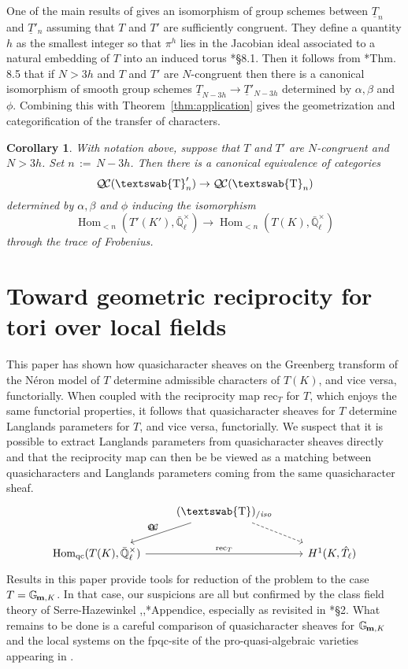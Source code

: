 \documentclass[11pt]{amsart}
\DeclareRobustCommand{\VAN}[3]{#2}
\newcommand{\mathswab}[1]{\operatorname{\textswab{#1}}}
\theoremstyle{plain}
\newtheorem{corollary}[theorem]{Corollary}
\theoremstyle{definition}
\theoremstyle{remark}
\newcommand{\EE}{\mathbb{\bar Q}_\ell}
\newcommand{\EEx}{\EE^\times}
\DeclareMathOperator{\Hom}{Hom}
\newcommand{\ceq}{{\, :=\, }}
\newcommand{\Gm}[1]{\mathbb{G}_{\hskip-1pt\textbf{m},#1}}
\newcommand{\GN}[1]{\mathswab{#1}}
\newcommand{\TT}{\underline{T}}
\newcommand{\QC}{{\mathcal{Q\hskip-0.8pt C}}}
\newcommand{\QCiso}[1]{\QC(#1)_{/\textit{iso}}}
\newcommand{\trFrob}[1]{t_{#1}}
\begin{document}
One of the main results of \cite{chai-yu:01a} gives an isomorphism of group schemes between
$\TT_n$ and $\TT'_n$ assuming that $T$ and $T'$ are sufficiently congruent.
They define a quantity $h$ as the smallest integer so that $\pi^h$ lies in the
Jacobian ideal associated to a natural embedding of $T$ into an induced torus \cite{chai-yu:01a}*{\S 8.1}.
Then it follows from \cite{chai-yu:01a}*{Thm. 8.5} that if $N > 3h$ and $T$ and $T'$ are $N$-congruent 
then there is a canonical isomorphism of smooth group schemes
 $
  \TT_{N-3h} \to \TT'_{N-3h}
 $
 determined by $\alpha, \beta$ and $\phi$.
Combining this with Theorem~\ref{thm:application} gives the geometrization and categorification of the transfer of characters.

\begin{corollary}\label{cor:transfer}
 With notation above, suppose that $T$ and $T'$ are $N$-congruent and $N > 3h$.  Set $n \ceq N-3h$.
 Then there is a canonical equivalence of categories
 \[
  \QC(\GN{T}'_{n}) \to \QC(\GN{T}_{n})
 \]
 determined by $\alpha, \beta$ and $\phi$ inducing the isomorphism
 \[
  \Hom_{<n}(T'(K'), \EEx) \to \Hom_{<n}(T(K), \EEx)
 \]
 through the trace of Frobenius.
\end{corollary}


\section{Toward geometric reciprocity for tori over local fields}
\label{sec:reciprocity}

This paper has shown how quasicharacter sheaves 
on the Greenberg transform of the Néron model of $T$ 
determine admissible characters of $T(K)$, and vice versa, functorially.
When coupled with the reciprocity map $\text{rec}_T $ for $T$, 
which enjoys the same functorial properties, 
it follows that quasicharacter sheaves for $T$ 
determine Langlands parameters for $T$, and vice versa, functorially.
We suspect that it is possible to extract Langlands parameters 
from quasicharacter sheaves directly and that the reciprocity map 
can then be be viewed as a matching between quasicharacters and Langlands parameters coming
 from the same quasicharacter sheaf. 
 \[
\begin{tikzcd}
\ & \arrow[swap]{dl}{\trFrob{G}} \QCiso{\GN{T}} \arrow[dashed]{dr} & \\
\Hom_{\text{qc}}(T(K),\EEx) \arrow{rr}{\text{rec}_T} && H^1(K,\hat{T}_\ell)
\end{tikzcd}
\]
 Results in this paper provide tools for reduction of the problem to the case $T=\Gm{K}$. 
 In that case, our suspicions are all but confirmed 
 by the class field theory of Serre-Hazewinkel
 \cite{serre:60a},\cite{serre:61a},\cite{demazure-gabriel:GroupesAlgebriques}*{Appendice},
 especially as revisited in \cite{suzuki-yoshida:12a}*{\S 2}. 
 What remains to be done is a careful comparison of 
 quasicharacter sheaves for $\Gm{K}$ and the local systems on
  the fpqc-site of the pro-quasi-algebraic varieties appearing in \cite{suzuki-yoshida:12a}. 


\DeclareRobustCommand{\VAN}[3]{#3}

\end{document}
